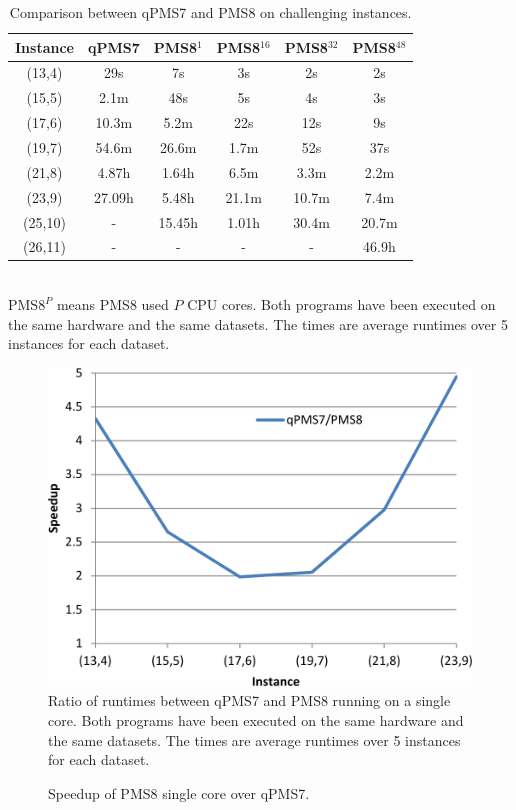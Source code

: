 \begin{table}
\caption{
 Comparison between qPMS7 and PMS8 on challenging instances. 
}\label{PMS8figCompChallenging}
\begin{tabular}{cccccc@{\extracolsep\fill}}
\hline
\textbf{Instance} & \textbf{qPMS7} & \textbf{PMS8$^1$} & \textbf{PMS8$^{16}$} &
\textbf{PMS8$^{32}$} & \textbf{PMS8$^{48}$} \\
\hline
(13,4) & 29s     & 7s     & 3s    & 2s    & 2s \\
(15,5) & 2.1m    & 48s    & 5s    & 4s    & 3s \\
(17,6) & 10.3m   & 5.2m   & 22s   & 12s   & 9s \\
(19,7) & 54.6m   & 26.6m  & 1.7m  & 52s   & 37s \\
(21,8) & 4.87h   & 1.64h  & 6.5m  & 3.3m  & 2.2m \\
(23,9) & 27.09h  & 5.48h  & 21.1m & 10.7m & 7.4m \\
(25,10)& -       & 15.45h & 1.01h & 30.4m & 20.7m \\
(26,11)& -       & -      & -     & -     & 46.9h \\
\hline
\end{tabular}\\
 PMS$8^P$ means  
 PMS8 used $P$ CPU cores. Both programs have been executed on the same hardware 
 and the same datasets. The times are average runtimes over 5 instances for each 
 dataset.
\end{table}



\begin{figure}
\caption{Speedup of PMS8 single core over qPMS7.}\label{PMS8figSpeedupQPMS7}
\includegraphics[width=\linewidth]{PMS8speedupQPMS7}
Ratio of runtimes between
qPMS7 and PMS8 running on a single core. Both programs have been executed on the same
hardware and the same datasets. The times are average runtimes over 5 instances
for each dataset.
\end{figure}


